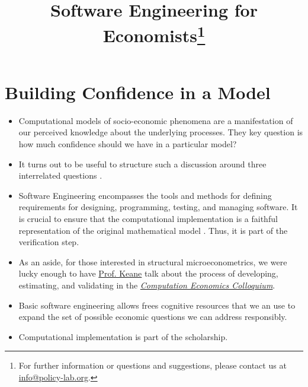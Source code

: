 	
\title{Software Engineering for Economists\thanks{For further information or questions and suggestions, please contact us at \href{mailto: info@policy-lab.org}{info@policy-lab.org}.}}
\author{ }\date{ } 


\section{Building Confidence in a Model}

\begin{itemize}
\item Computational models of socio-economic phenomena are a manifestation of our perceived knowledge about the underlying processes. They key question is how much confidence should we have in a particular model? 
\item  It turns out to be useful to structure such a discussion around three interrelated questions \citet{Council.2012}.
\item  Software Engineering encompasses the tools and methods for defining requirements for designing, programming, testing, and managing software. It is crucial to ensure that the computational implementation is a faithful representation of the original mathematical model \citet{Oberkampf.2010}. Thus, it is part of the verification step.
\item As an aside, for those interested in structural microeconometrics, we were lucky enough to have \href{http://www.economics.ox.ac.uk/Academic/michael-keane}{Prof. Keane} talk about the process of developing, estimating, and validating in the \href{http://bfi.uchicago.edu/events/computational-economics-colloquium}{\textit{Computation Economics Colloquium}}.
\item Basic software engineering allows frees cognitive resources that we an use to expand the set of possible economic questions we can address responsibly.
\item Computational implementation is part of the scholarship.
\end{itemize}
